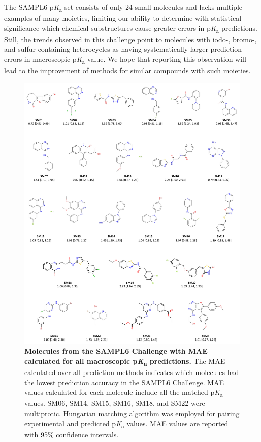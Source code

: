 \documentclass[9pt,lineno,final]{elife}
\newcommand{\pKa}{p\textit{K}\textsubscript{a}}
\begin{document}
The SAMPL6 \pKa{} set consists of only 24 small molecules and lacks multiple examples of many moieties, limiting our ability to determine with statistical significance which chemical substructures cause greater errors in \pKa{} predictions. 
Still, the trends observed in this challenge point to molecules with iodo-, bromo-, and sulfur-containing heterocycles as having systematically larger prediction errors in macroscopic \pKa{} value. 
We hope that reporting this observation will lead to the improvement of methods for similar compounds with such moieties. 


\begin{figure}
\begin{center}
\includegraphics[width=0.95\linewidth]{figures/molecules_with_MAE_of_all_methods.pdf}
\caption{{\bf Molecules from the SAMPL6 Challenge with MAE calculated for all macroscopic \pKa{} predictions.} 
The MAE calculated over all prediction methods indicates which molecules had the lowest prediction accuracy in the SAMPL6 Challenge. 
MAE values calculated for each molecule include all the matched \pKa{} values. 
SM06, SM14, SM15, SM16, SM18, and SM22 were multiprotic. 
Hungarian matching algorithm was employed for pairing experimental and predicted \pKa{} values. 
MAE values are reported with 95\% confidence intervals.
}
\label{fig:molecules_with_MAE_of_all_methods}
\end{center}
\end{figure}
\end{document}
